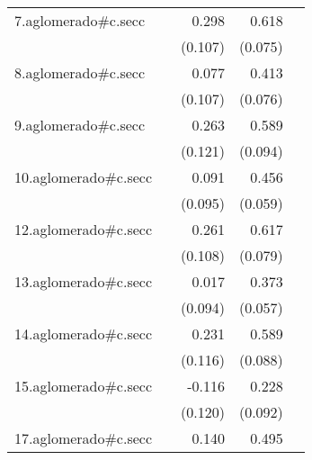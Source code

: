 {\begin{longtable}{l*{4}{D{.}{.}{-1}}}
\addlinespace
7.aglomerado#c.secc&                     &       0.298\sym{**} &       0.618\sym{***}&                     \\
            &                     &     (0.107)         &     (0.075)         &                     \\
\addlinespace
8.aglomerado#c.secc&                     &       0.077         &       0.413\sym{***}&                     \\
            &                     &     (0.107)         &     (0.076)         &                     \\
\addlinespace
9.aglomerado#c.secc&                     &       0.263\sym{*}  &       0.589\sym{***}&                     \\
            &                     &     (0.121)         &     (0.094)         &                     \\
\addlinespace
10.aglomerado#c.secc&                     &       0.091         &       0.456\sym{***}&                     \\
            &                     &     (0.095)         &     (0.059)         &                     \\
\addlinespace
12.aglomerado#c.secc&                     &       0.261\sym{*}  &       0.617\sym{***}&                     \\
            &                     &     (0.108)         &     (0.079)         &                     \\
\addlinespace
13.aglomerado#c.secc&                     &       0.017         &       0.373\sym{***}&                     \\
            &                     &     (0.094)         &     (0.057)         &                     \\
\addlinespace
14.aglomerado#c.secc&                     &       0.231\sym{*}  &       0.589\sym{***}&                     \\
            &                     &     (0.116)         &     (0.088)         &                     \\
\addlinespace
15.aglomerado#c.secc&                     &      -0.116         &       0.228\sym{*}  &                     \\
            &                     &     (0.120)         &     (0.092)         &                     \\
\addlinespace
17.aglomerado#c.secc&                     &       0.140         &       0.495\sym{***}&                     \\

\end{longtable}}

